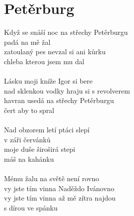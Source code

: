 \section{Petěrburg}
Když se snáší noc na střechy Petěrburgu\\
padá na mě žal\\
zatoulaný pes nevzal si ani kůrku\\
chleba kterou jsem mu dal\\
\\
\oz Lásku moji kníže Igor si bere\\
nad sklenkou vodky hraju si s revolverem\\
havran usedá na střechy Petěrburgu\\
čert aby to spral\ok\\
\\
Nad obzorem letí ptáci slepí\\
v záři červánků\\
moje duše široširá stepi\\
máš na kahánku\\
\\
\oz Mému žalu na světě není rovno\\
vy jste tím vinna Naděždo Ivánovno\\
vy jste tím vinna až mě zítra najdou\\
s dírou ve spánku\ok\\
